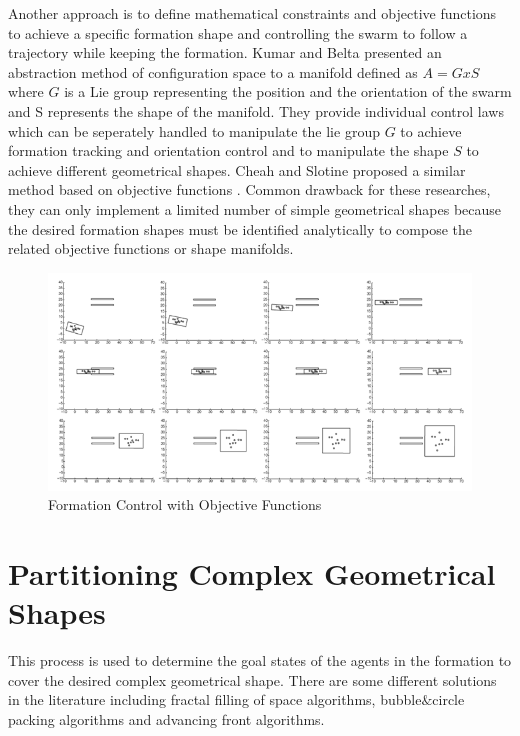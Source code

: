 Another approach is to define mathematical constraints and objective functions to achieve a specific formation shape and controlling the swarm to follow a trajectory while keeping the formation.  Kumar and Belta presented an abstraction method of configuration space to a manifold defined as $A  = G x S$ where $G$ is a Lie group representing the position and the orientation of the swarm  and S represents the shape of the manifold.  They provide individual control laws which can be seperately handled to manipulate the lie group $G$ to achieve formation tracking and orientation control and to manipulate the shape $S$ to achieve different geometrical shapes. Cheah and Slotine proposed a similar method based on objective functions \cite{8}.  Common drawback for these researches, they can only implement a limited number of simple geometrical shapes because the desired formation shapes must be identified analytically to compose the related objective functions or shape manifolds. 



\begin{figure}[H]
	\caption{Formation Control with Objective Functions \cite{25}}
	\centering
	\includegraphics[scale = 0.8]{manifold}
\end{figure}



\section{Partitioning Complex Geometrical Shapes}


This process is used to determine the goal states of the agents in the formation to cover the desired complex geometrical shape. There are some different solutions in the literature including fractal filling of space algorithms, bubble$\&$circle packing algorithms and advancing front algorithms. 

